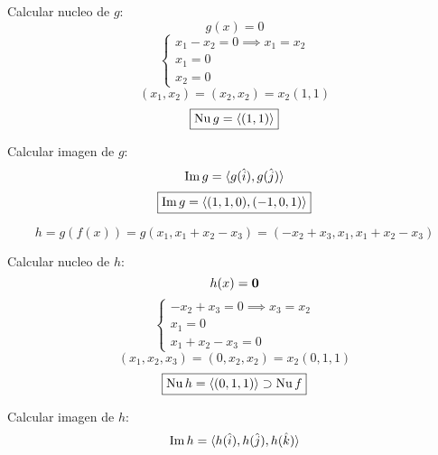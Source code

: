 \documentclass[../practica.root.tex]{subfiles}
\begin{document}
\begin{enumerate}
\begin{enumerate}
                    \begin{minipage}[t]{0.5\textwidth}
                        Calcular nucleo de $g$:
                        \[
                            g(x) = 0
                        \] \[
                            \begin{cases}
                                x_1 - x_2 = 0 \implies x_1 = x_2 \\
                                x_1 = 0                          \\
                                x_2 = 0
                            \end{cases}
                        \] \[
                            (x_1, x_2) = (x_2, x_2) = x_2(1,1)
                        \] \[
                            \boxed{\operatorname{Nu} g = \langle (1,1) \rangle}
                        \]
                    \end{minipage}
                    \begin{minipage}[t]{0.5\textwidth}
                        Calcular imagen de $g$:
                        \[ \operatorname{Im} g = \langle g(\hat{i}),g(\hat{j}) \rangle \]
                        \[ \boxed{\operatorname{Im} g = \langle (1,1,0),(-1,0,1) \rangle} \]
                    \end{minipage}
                    \[ h = g(f(x)) = g(x_1, x_1 + x_2 - x_3) = (-x_2 + x_3, x_1, x_1 + x_2 - x_3) \]
                    \begin{minipage}[t]{0.5\textwidth}
                        Calcular nucleo de $h$:
                        \[ h(x) = \mathbf{0} \]
                        \[
                            \begin{cases}
                                -x_2 + x_3 = 0 \implies x_3 = x_2 \\
                                x_1 = 0                           \\
                                x_1 + x_2 - x_3 = 0
                            \end{cases}
                        \] \[
                            (x_1,x_2,x_3) = (0,x_2,x_2) = x_2(0,1,1)
                        \] \[
                            \boxed{\operatorname{Nu} h = \langle (0,1,1) \rangle \supset \operatorname{Nu} f}
                        \]
                    \end{minipage}
                    \begin{minipage}[t]{0.5\textwidth}
                        Calcular imagen de $h$:
                        \[ \operatorname{Im} h = \langle h(\hat{i}),h(\hat{j}),h(\hat{k}) \rangle \]

\end{minipage}
\end{enumerate}
\end{enumerate}
\end{document}
